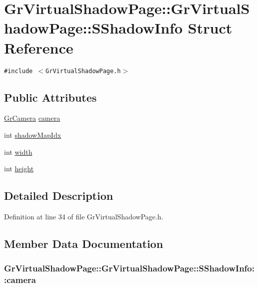 \hypertarget{struct_gr_virtual_shadow_page_1_1_s_shadow_info}{
\section{GrVirtualShadowPage::GrVirtualShadowPage::SShadowInfo Struct Reference}
\label{struct_gr_virtual_shadow_page_1_1_s_shadow_info}
}
{\tt \#include $<$GrVirtualShadowPage.h$>$}

\subsection*{Public Attributes}
\begin{CompactItemize}
\item 
\hyperlink{class_gr_camera}{GrCamera} \hyperlink{struct_gr_virtual_shadow_page_1_1_s_shadow_info_26206f64ecfa6c16d246728ec14eb40c}{camera}
\item 
int \hyperlink{struct_gr_virtual_shadow_page_1_1_s_shadow_info_7f7e9d5b244e39ccc703ccd4d93c9529}{shadowMapIdx}
\item 
int \hyperlink{struct_gr_virtual_shadow_page_1_1_s_shadow_info_8c1baf33631ec0aa71acb781cfbe2459}{width}
\item 
int \hyperlink{struct_gr_virtual_shadow_page_1_1_s_shadow_info_9558ecd2760590cd97d3133ae338f59d}{height}
\end{CompactItemize}


\subsection{Detailed Description}


Definition at line 34 of file GrVirtualShadowPage.h.

\subsection{Member Data Documentation}
\hypertarget{struct_gr_virtual_shadow_page_1_1_s_shadow_info_26206f64ecfa6c16d246728ec14eb40c}{
\subsubsection[{camera}]{ GrVirtualShadowPage::GrVirtualShadowPage::SShadowInfo::camera}}
\label{struct_gr_virtual_shadow_page_1_1_s_shadow_info_26206f64ecfa6c16d246728ec14eb40c}




